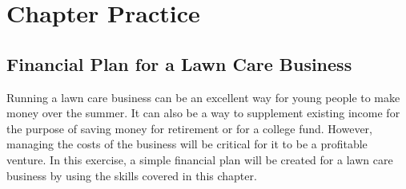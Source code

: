 \section{Chapter Practice}

\subsection{Financial Plan for a Lawn Care Business}

Running a lawn care business can be an excellent way for young people to make money over the summer. It can also be a way to supplement existing income for the purpose of saving money for retirement or for a college fund. However, managing the costs of the business will be critical for it to be a profitable venture. In this exercise, a simple financial plan will be created for a lawn care business by using the skills covered in this chapter.

